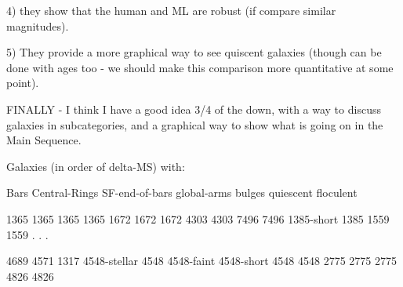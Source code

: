 4) they show that the human and ML are robust (if compare similar magnitudes).
 
5) They provide a more graphical way to see quiscent galaxies (though can be done with ages too - we should make this comparison more quantitative at some point).
 
 
FINALLY - I think I have a good idea 3/4 of the down, with a way to discuss galaxies in subcategories, and a graphical way to show what is going on in the Main Sequence.
 
Galaxies (in order of delta-MS) with:
 
Bars                       Central-Rings      SF-end-of-bars   global-arms         bulges   quiescent             floculent                             
 
1365                      1365                      1365                      1365                                                                     
1672                      1672                      1672                                                                                                     
4303                                                      4303                                                                                                     
7496                                                      7496                                                                                                     
1385-short                                                                                                                                                          1385                     
1559                                                                                      1559
.
.
.
 
                                                                                                                                                4689
                                                                                                                                                4571
                                                                                                                                                1317
4548-stellar        4548                      4548-faint            4548-short                          4548                      4548     
                                                                                                                                2775      2775                      2775
                                                                                                                                4826      4826     
 

